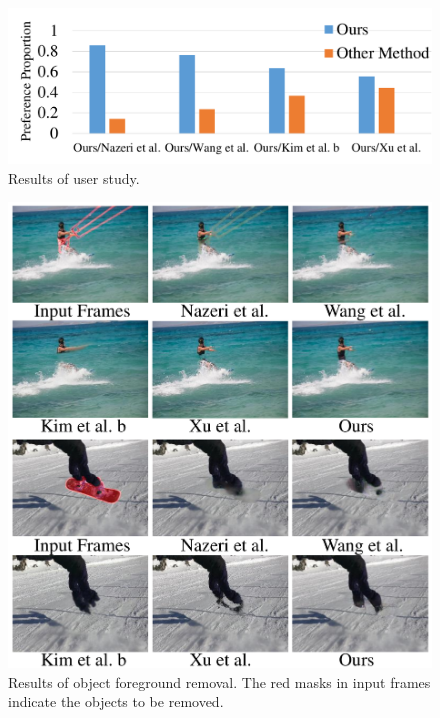 %
\begin{figure}[!t]
	\centering
	\includegraphics[width=1.0\columnwidth]{userstudy} %
	\caption{Results of user study.}
	\label{userstudy}
\end{figure}

%
\begin{figure}[!h]
	\centering
	\includegraphics[width=1.0\columnwidth]{vis_forg} %
	\caption{Results of object foreground removal. The red masks in input frames indicate the objects to be removed.}
	\label{vis_forg}
\end{figure}


